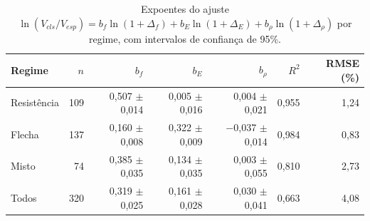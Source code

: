 \begin{table}[!ht]
\centering
\caption{Expoentes do ajuste $\ln(V_{cls}/V_{esp})=b_f\ln(1+\Delta_f)+b_E\ln(1+\Delta_E)+b_\rho\ln(1+\Delta_\rho)$ por regime, com intervalos de confiança de 95\%.}
\label{tab:res_regressao}
\footnotesize
\begin{tabular}{lrrrrrr}
\toprule
Regime & $n$ & $b_f$ & $b_E$ & $b_\rho$ & $R^2$ & RMSE (\%) \\
\midrule
Resistência & 109 & 0{,}507 $\pm$ 0{,}014 & 0{,}005 $\pm$ 0{,}016 & 0{,}004 $\pm$ 0{,}021 & 0{,}955 & 1{,}24 \\
Flecha & 137 & 0{,}160 $\pm$ 0{,}008 & 0{,}322 $\pm$ 0{,}009 & $-$0{,}037 $\pm$ 0{,}014 & 0{,}984 & 0{,}83 \\
Misto & 74 & 0{,}385 $\pm$ 0{,}035 & 0{,}134 $\pm$ 0{,}035 & 0{,}003 $\pm$ 0{,}055 & 0{,}810 & 2{,}73 \\
Todos & 320 & 0{,}319 $\pm$ 0{,}025 & 0{,}161 $\pm$ 0{,}028 & 0{,}030 $\pm$ 0{,}041 & 0{,}663 & 4{,}08 \\
\bottomrule
\end{tabular}
\end{table}